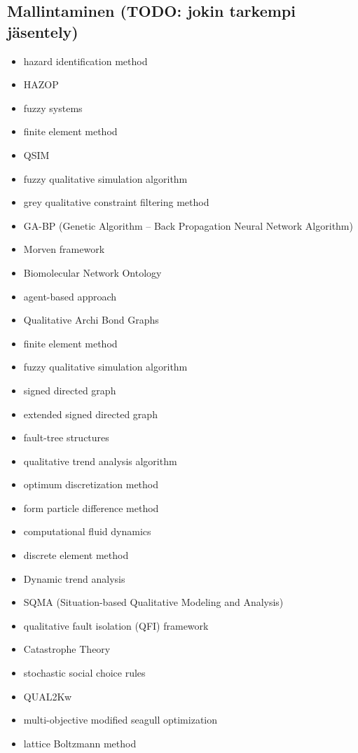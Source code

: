 \documentclass[utf8]{gradu3}
\begin{document}
\subsection{Mallintaminen (TODO: jokin tarkempi jäsentely)}
\begin{itemize}
    \item hazard identification method
    \item HAZOP
    \item fuzzy systems 
    \item finite element method 
    \item QSIM 
    \item fuzzy qualitative simulation algorithm 
    \item grey qualitative constraint filtering method 
    \item GA-BP (Genetic Algorithm – Back Propagation Neural Network Algorithm) 
    \item Morven framework 
    \item Biomolecular Network Ontology 
    \item agent-based approach 
    \item Qualitative Archi Bond Graphs 
    \item finite element method 
    \item fuzzy qualitative simulation algorithm 
    \item signed directed graph 
    \item extended signed directed graph 
    \item fault-tree structures 
    \item qualitative trend analysis algorithm 
    \item optimum discretization method 
    \item form particle difference method 
    \item computational fluid dynamics 
    \item discrete element method 
    \item Dynamic trend analysis 
    \item SQMA (Situation-based Qualitative Modeling and Analysis) 
    \item qualitative fault isolation (QFI) framework 
    \item Catastrophe Theory 
    \item stochastic social choice rules 
    \item QUAL2Kw 
    \item multi-objective modified seagull optimization 
    \item lattice Boltzmann method 

\end{itemize}
\end{document}
